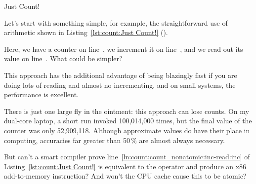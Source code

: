 \begin{listing}[tbp]

\caption{Just Count!}
\label{lst:count:Just Count!}
\end{listing}

Let's start with something simple, for example, the straightforward
use of arithmetic shown in
Listing~\ref{lst:count:Just Count!} ().
\begin{lineref}
Here, we have a counter on line~, we increment it on
line~, and we read out its value on line~.
What could be simpler?
\end{lineref}

This approach has the additional advantage of being blazingly fast if
you are doing lots of reading and almost no incrementing, and on small
systems, the performance is excellent.

There is just one large fly in the ointment: this approach can lose
counts.
On my dual-core laptop, a short run invoked 
100,014,000 times, but the final value of the counter was only
52,909,118.
Although approximate values do have their place in computing,
accuracies far greater than 50\,\% are almost always necessary.

\QuickQuiz{}
	But can't a smart compiler prove
	line~\ref{ln:count:count_nonatomic:inc-read:inc}
	of
	Listing~\ref{lst:count:Just Count!}
	is equivalent to the \co{++} operator and produce an x86
	add-to-memory instruction?
	And won't the CPU cache cause this to be atomic?
 \QuickQuizEnd

